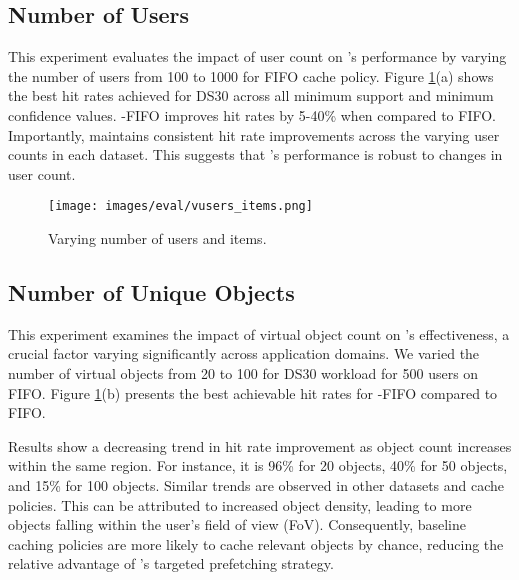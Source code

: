     \subsection{Number of Users}
        This experiment evaluates the impact of user count on \spaarc's performance by varying the number of users from 100 to 1000 for FIFO cache policy. Figure \ref{fig:vusers_vitems}(a) shows the best hit rates achieved for DS30 across all minimum support and minimum confidence values.  \spaarc{}-FIFO improves hit rates by 5-40\% when compared to FIFO. Importantly, \spaarc{} maintains consistent hit rate improvements across the varying user counts in each dataset. This suggests that \spaarc's performance is robust to changes in user count.
        \begin{figure}[h]
            \centering
            \texttt{[image: images/eval/vusers\_items.png]}
            \caption{Varying number of users and items. %
            }
            \label{fig:vusers_vitems}
        \end{figure}

    \subsection{Number of Unique Objects}
        This experiment examines the impact of virtual object count on \spaarc's effectiveness, a crucial factor varying significantly across application domains.  We varied the number of virtual objects from 20 to 100 for DS30 workload for 500 users on FIFO. Figure \ref{fig:vusers_vitems}(b) presents the best achievable hit rates for \spaarc{}-FIFO compared to FIFO.

        Results show a decreasing trend in hit rate improvement as object count increases within the same region. For instance, it is 96\% for 20 objects, 40\% for 50 objects, and 15\% for 100 objects.  Similar trends are observed in other datasets and cache policies. This can be attributed to increased object density, leading to more objects falling within the user's field of view (FoV).  Consequently, baseline caching policies are more likely to cache relevant objects by chance, reducing the relative advantage of \spaarc{}'s targeted prefetching strategy.
            
